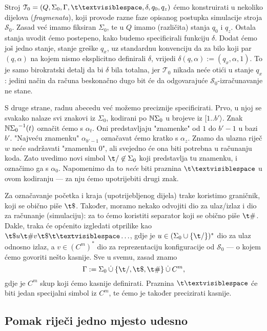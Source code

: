 Stroj $\mathcal T_0=(Q,\Sigma_0,\Gamma,\bl,\delta,q_0,q_z)$ ćemo konstruirati u nekoliko dijelova (\emph{fragmenata}), koji provode razne faze opisanog postupka simulacije stroja $\mathcal S_0$. Zasad već imamo fiksiran $\Sigma_0$, te u $Q$ imamo (različita) stanja $q_0$ i $q_z$.
Ostala stanja uvodit ćemo postepeno, kako budemo specificirali funkciju $\delta$. Dodat ćemo još jedno stanje, stanje greške $q_x$, uz standardnu konvenciju da za bilo koji par $(q,\alpha)$ na kojem nismo eksplicitno definirali $\delta$, vrijedi $\delta(q,\alpha):=(q_x,\alpha,1)$. To je samo birokratski detalj da bi $\delta$ bila totalna, jer $\mathcal T_0$ nikada neće otići u stanje $q_x$: jedini način da računa beskonačno dugo bit će da odgovarajuće $\mathcal S_0$-izračunavanje ne stane.

S druge strane, radnu abecedu već možemo preciznije specificirati. Prvo, u njoj se svakako nalaze svi znakovi iz $\Sigma_0$, kodirani po ${\mathbb N}\Sigma_0$ u brojeve iz $[1..b'\rangle$. Znak ${{\mathbb N}\Sigma_0}^{-1}(t)$ označit ćemo s $\alpha_t$. Oni predstavljaju "znamenke" od $1$ do $b'-1$ u bazi $b'$. "Najveću znamenku" $\alpha_{b'-1}$ označavat ćemo kratko s $\alpha_z$. Znamo da ulazna riječ $w$ neće sadržavati "znamenku $0$", ali svejedno će ona biti potrebna u računanju koda. Zato uvedimo novi simbol $\t/\not\in\Sigma_0$ koji predstavlja tu znamenku, i označimo ga s $\alpha_0$. Napomenimo da to \emph{neće} biti praznina $\bl$ u ovom kodiranju --- za nju ćemo upotrijebiti drugi znak.

Za označavanje početka i kraja (upotrijebljenog dijela) trake koristimo graničnik, koji se obično piše $\t\$$. Također, moramo nekako odvojiti dio za ulaz\slash izlaz i dio za računanje (simulaciju): za to ćemo koristiti separator koji se obično piše $\t\#$. Dakle, traka će općenito izgledati otprilike kao $\t\$u\t\#v\t\$\bl\ldots$, gdje je $u\in(\Sigma_0\cup\{\t/\})^*$ dio za ulaz odnosno izlaz, a $v\in(C^m)^*$ dio za reprezentaciju konfiguracije od $\mathcal S_0$ --- o kojem ćemo govoriti nešto kasnije. Sve u svemu, zasad znamo
\begin{equation}
    \Gamma:=\Sigma_0\mathbin{\dot\cup}\{\t/,\t\$,\t\#\}\mathbin{\dot\cup}C^m\text,
\end{equation}
gdje je $C^m$ skup koji ćemo kasnije definirati. Praznina $\bl$ će biti jedan specijalni simbol iz $C^m$, te ćemo je također precizirati kasnije.

\subsection{Pomak riječi jedno mjesto udesno}

